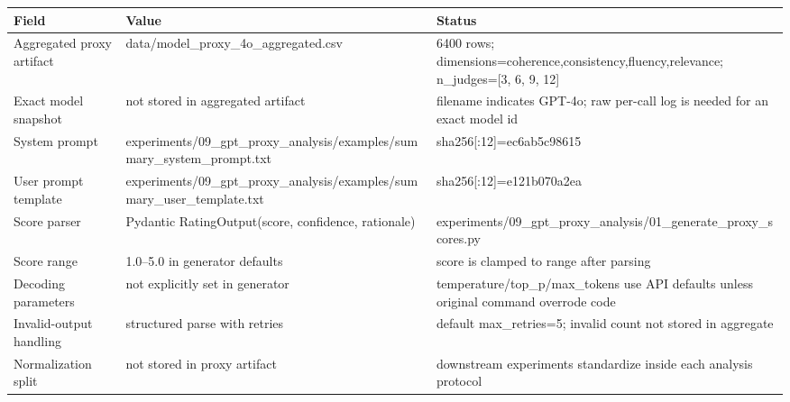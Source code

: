 \begin{tabular}{lll}
\toprule
Field & Value & Status \\
\midrule
Aggregated proxy artifact & data/model\_proxy\_4o\_aggregated.csv & 6400 rows; dimensions=coherence,consistency,fluency,relevance; n\_judges=[3, 6, 9, 12] \\
Exact model snapshot & not stored in aggregated artifact & filename indicates GPT-4o; raw per-call log is needed for an exact model id \\
System prompt & experiments/09\_gpt\_proxy\_analysis/examples/summary\_system\_prompt.txt & sha256[:12]=ec6ab5c98615 \\
User prompt template & experiments/09\_gpt\_proxy\_analysis/examples/summary\_user\_template.txt & sha256[:12]=e121b070a2ea \\
Score parser & Pydantic RatingOutput(score, confidence, rationale) & experiments/09\_gpt\_proxy\_analysis/01\_generate\_proxy\_scores.py \\
Score range & 1.0--5.0 in generator defaults & score is clamped to range after parsing \\
Decoding parameters & not explicitly set in generator & temperature/top\_p/max\_tokens use API defaults unless original command overrode code \\
Invalid-output handling & structured parse with retries & default max\_retries=5; invalid count not stored in aggregate \\
Normalization split & not stored in proxy artifact & downstream experiments standardize inside each analysis protocol \\
\bottomrule
\end{tabular}
